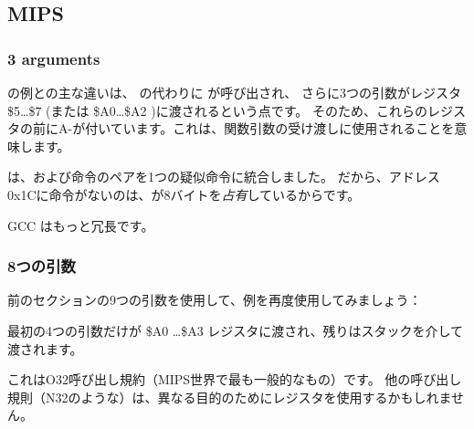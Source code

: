 \subsection{MIPS}

\subsubsection{3 arguments}


\q{\HelloWorldSectionName} の例との主な違いは、 \puts の代わりに \printf が呼び出され、
さらに3つの引数がレジスタ \$5\dots \$7 (または \$A0\dots \$A2 )に渡されるという点です。 
そのため、これらのレジスタの前にA-が付いています。これは、関数引数の受け渡しに使用されることを意味します。





\IDA は、および命令のペアを1つの疑似命令に統合しました。 
だから、アドレス0x1Cに命令がないのは、が8バイトを\emph{占有}しているからです。


\NonOptimizing GCC はもっと冗長です。





\subsubsection{8つの引数}

前のセクションの9つの引数を使用して、例を再度使用してみましょう：




最初の4つの引数だけが \$A0 \dots \$A3 レジスタに渡され、残りはスタックを介して渡されます。

これはO32呼び出し規約（MIPS世界で最も一般的なもの）です。 
他の呼び出し規則（N32のような）は、異なる目的のためにレジスタを使用するかもしれません。


